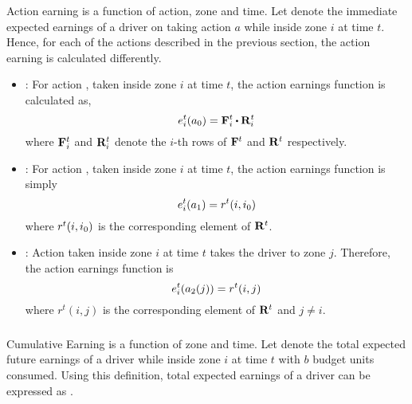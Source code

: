Action earning is a function of action, zone and time. Let  denote the immediate expected earnings of a driver 
on taking action $a$ while inside zone $i$ at time $t$. Hence, for each of the actions described in the previous section, the
action earning is calculated differently.

\begin{itemize}
	\item {\getpassenger} : For action {\getpassengeraction}, taken inside zone $i$ at time $t$, the action earnings function
	is calculated as,
	\begin{equation}
	\actionearning{i}{t}{a_0} = \empiricaltransitionmatrix_{i}^{t} \bigcdot \rewardsmatrix_{i}^{t}
	\end{equation}
	where ${\mathbf{F}}_{i}^{t}$ and ${\mathbf{R}}_{i}^{t}$ denote the $i$-th rows of ${\mathbf{F}}^{t}$ and ${\mathbf{R}}^{t}$ respectively. \\

	\item {\gohome} : For action {\gohomeaction}, taken inside zone $i$ at time $t$, the action earnings function is simply
	\begin{equation}
	e_{i}^{t}({a_1}) = r^t(i,{i_0})
	\end{equation}
	where $r^t(i,{i_0})$ is the corresponding element of ${\mathbf{R}}^{t}$. \\

	\item {\relocate} : Action {\relocateaction} taken inside zone $i$ at time $t$ takes the driver to zone $j$. Therefore, the action earnings function is
	\begin{equation}
	e_{i}^{t}({a_2(j)}) = r^t(i,j)
	\end{equation}
	where $r^t(i,j)$ is the corresponding element of ${\mathbf{R}}^{t}$ and $j \neq i$. \\
\end{itemize}

\subsubsection{}

Cumulative Earning is a function of zone and time. Let  denote the total expected future earnings of a driver
while inside zone $i$ at time $t$ with $b$ budget units consumed. Using this definition, total expected earnings of a driver can be expressed
as .

